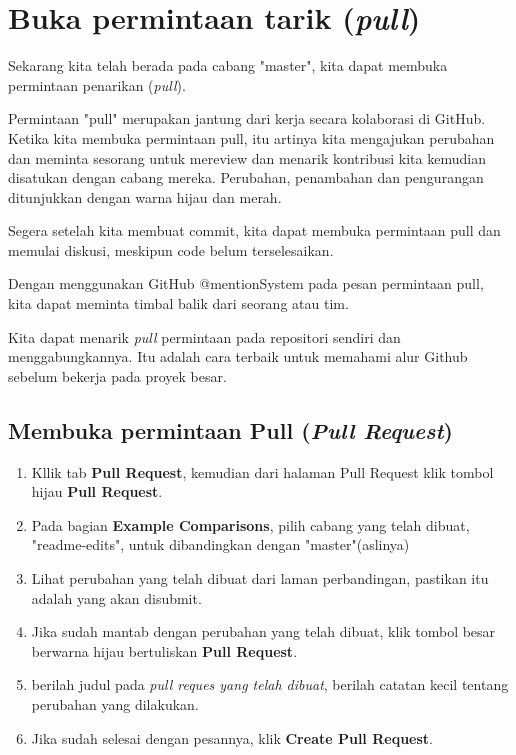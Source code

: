 \documentclass[12pt,a4paper]{article}
\begin{document}
\section{Buka permintaan tarik (\textit{pull})}
Sekarang kita telah berada pada cabang "master", kita dapat membuka permintaan penarikan (\textit{pull}).

Permintaan "pull" merupakan jantung dari kerja secara kolaborasi di GitHub. Ketika kita membuka permintaan pull, itu artinya kita mengajukan perubahan dan meminta sesorang untuk mereview dan menarik kontribusi kita kemudian disatukan dengan cabang mereka. Perubahan, penambahan dan pengurangan ditunjukkan dengan warna hijau dan merah.

Segera setelah kita membuat commit, kita dapat membuka permintaan pull dan memulai diskusi, meskipun code belum terselesaikan.

Dengan menggunakan GitHub @mentionSystem pada pesan permintaan pull, kita dapat meminta timbal balik dari seorang atau tim.

Kita dapat menarik \textit{pull} permintaan pada repositori sendiri dan menggabungkannya. Itu adalah cara terbaik untuk memahami alur Github sebelum bekerja pada proyek besar.

\subsection*{Membuka permintaan Pull (\textit{Pull Request})}

\begin{enumerate}
\item Kllik tab \textbf{Pull Request}, kemudian dari halaman Pull Request klik tombol hijau \textbf{Pull Request}.
\item Pada bagian \textbf{Example Comparisons}, pilih cabang yang telah dibuat, "readme-edits", untuk dibandingkan dengan "master"(aslinya)
\item Lihat perubahan yang telah dibuat dari laman perbandingan, pastikan itu adalah yang akan disubmit. 
\item Jika sudah mantab dengan perubahan yang telah dibuat, klik tombol besar berwarna hijau bertuliskan \textbf{Pull Request}.
\item berilah judul pada \textit{pull reques yang telah dibuat}, berilah catatan kecil tentang perubahan yang dilakukan.
\item Jika sudah selesai dengan pesannya, klik \textbf{Create Pull Request}.
\end{enumerate}
\end{document}
